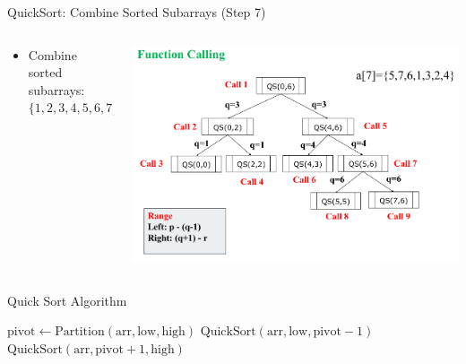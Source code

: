 \begin{frame}{QuickSort: Combine Sorted Subarrays (Step 7)}
  \begin{columns}
    \begin{column}{0.4\textwidth}
      \begin{itemize}
        \item Combine sorted subarrays: $\{1, 2, 3, 4, 5, 6, 7\}$
      \end{itemize}
    \end{column}
    \begin{column}{0.6\textwidth}
      \includegraphics[width=\textwidth]{assets/Qu4.png}
    \end{column}
  \end{columns}
\end{frame}





\begin{frame}{Quick Sort Algorithm}
    \begin{algorithm}[H]
        \caption{Quick Sort}
        \begin{algorithmic}[1]
                    \State $\text{pivot} \gets \text{Partition}(\text{arr}, \text{low}, \text{high})$
                    \State $\text{QuickSort}(\text{arr}, \text{low}, \text{pivot} - 1)$
                    \State $\text{QuickSort}(\text{arr}, \text{pivot} + 1, \text{high})$
                \EndIf
            \EndProcedure
        \end{algorithmic}
    \end{algorithm}
\end{frame}



